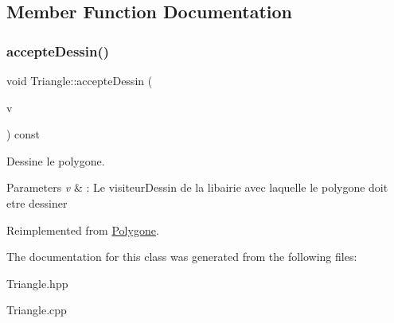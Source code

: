 \subsection{Member Function Documentation}
\mbox{\label{class_triangle_a62721a9e7bba3365fa3b72534511ee2b}} 
\subsubsection{\texorpdfstring{accepteDessin()}{accepteDessin()}}
{\footnotesize\ttfamily void Triangle\+::accepte\+Dessin (\begin{DoxyParamCaption}\item[{\mbox{\hyperlink{class_visitor_dessiner_forme}{Visitor\+Dessiner\+Forme}} $\ast$}]{v }\end{DoxyParamCaption}) const\hspace{0.3cm}{\ttfamily [virtual]}}



Dessine le polygone. 


\begin{DoxyParams}{Parameters}
{\em v} & \+: Le visiteur\+Dessin de la libairie avec laquelle le polygone doit etre dessiner \\
\hline
\end{DoxyParams}


Reimplemented from \mbox{\hyperlink{class_polygone_ae39b5264345f7d2f64112a9680155844}{Polygone}}.



The documentation for this class was generated from the following files\+:\begin{DoxyCompactItemize}
\item 
Triangle.\+hpp\item 
Triangle.\+cpp\end{DoxyCompactItemize}
